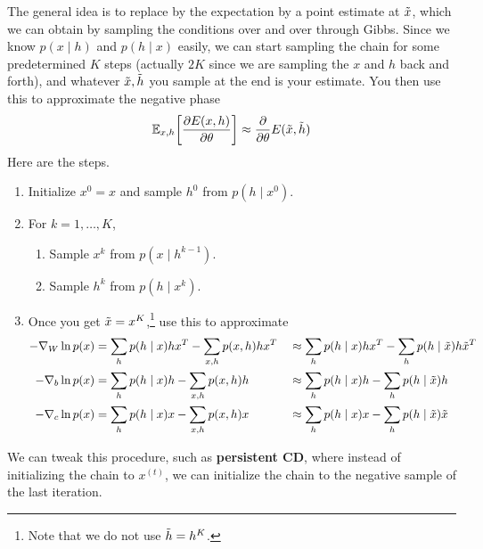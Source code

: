     \begin{algo} 
      The general idea is to replace by the expectation by a point estimate at $\Tilde{x}$, which we can obtain by sampling the conditions over and over through Gibbs. Since we know $p(x\mid h)$ and $p(h \mid x)$ easily, we can start sampling the chain for some predetermined $K$ steps (actually $2K$ since we are sampling the $x$ and $h$ back and forth), and whatever $\Tilde{x}, \Tilde{h}$ you sample at the end is your estimate. You then use this to approximate the negative phase 
      \begin{equation}
        \mathbb{E}_{x, h} \bigg[ \frac{\partial E(x, h)}{\partial \theta} \bigg] \approx \frac{\partial}{\partial \theta} E(\Tilde{x}, \Tilde{h})
      \end{equation}
      Here are the steps. 
      \begin{enumerate}
        \item Initialize $x^0 = x$ and sample $h^0$ from $p(h \mid x^0)$. 
        \item For $k = 1, \ldots, K$, 
        \begin{enumerate}
          \item Sample $x^k$ from $p(x \mid h^{k-1})$. 
          \item Sample $h^k$ from $p(h \mid x^k)$. 
        \end{enumerate}
        \item Once you get $\Tilde{x} = x^K$,\footnote{Note that we do not use $\Tilde{h} = h^K$.} use this to approximate 
        \begin{align}
          - \nabla_W \ln{p(x)} & = \sum_h p(h \mid x) h x^T - \sum_{x, h} p(x, h) h x^T && \approx \sum_h p(h \mid x) h x^T - \sum_h p(h \mid \Tilde{x}) h \Tilde{x}^T \\
          - \nabla_b \ln{p(x)} & =  \sum_h p(h \mid x) h - \sum_{x, h} p(x, h) h && \approx \sum_h p(h \mid x) h - \sum_h p(h \mid \Tilde{x}) h \\
          - \nabla_c \ln{p(x)} & =  \sum_h p(h \mid x) x - \sum_{x, h} p(x, h) x && \approx \sum_h p(h \mid x) x - \sum_h p(h \mid \Tilde{x}) \Tilde{x}
        \end{align}
      \end{enumerate}

      We can tweak this procedure, such as \textbf{persistent CD}, where instead of initializing the chain to $x^{(t)}$, we can initialize the chain to the negative sample of the last iteration. 


\end{algo}
